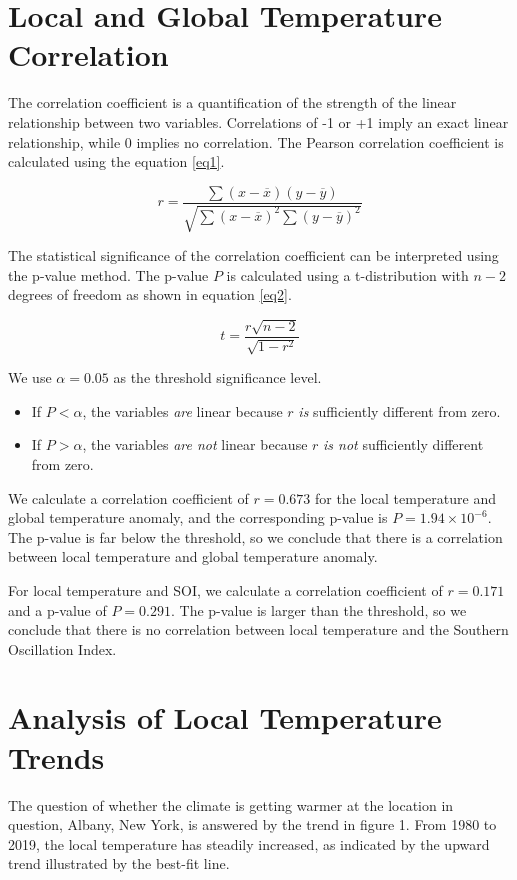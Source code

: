 \documentclass[12pt]{article}
\begin{document}
\section*{Local and Global Temperature Correlation}
The correlation coefficient is a quantification of the
strength of the linear relationship between two variables.
Correlations of -1 or +1 imply an exact linear relationship,
while 0 implies no correlation.
The Pearson correlation coefficient is calculated using
the equation \ref{eq1}.

\begin{equation}\label{eq1}
 r = \frac{\sum (x - \overline{x}) (y - \overline{y})}
 {\sqrt{\sum (x - \overline{x})^2 \sum (y - \overline{y})^2}}
\end{equation}

The statistical significance of the correlation coefficient can be
interpreted using the p-value method.
The p-value $P$ is calculated using a t-distribution with
$n - 2$ degrees of freedom as shown in equation \ref{eq2}.

\begin{equation}\label{eq2}
 t = \frac{r \sqrt{n-2}}{\sqrt{1 - r^2}}
\end{equation}

We use $\alpha = 0.05$ as the threshold significance level.
\begin{itemize}
 \item If $P < \alpha$, the variables \textit{are}
 linear because $r$ \textit{is} sufficiently different from zero.
 \item If $P > \alpha$, the variables \textit{are not}
 linear because $r$ \textit{is not} sufficiently different from zero.
\end{itemize}

We calculate a correlation coefficient of $r = 0.673$ for
the local temperature and global temperature anomaly,
and the corresponding p-value is $P = 1.94 \times 10^{-6}$.
The p-value is far below the threshold, so we conclude that
there is a correlation between local temperature and
global temperature anomaly.

For local temperature and SOI, we calculate a correlation
coefficient of $r = 0.171$ and a p-value of $P = 0.291$.
The p-value is larger than the threshold, so we
conclude that there is no correlation between local temperature
and the Southern Oscillation Index.

\section*{Analysis of Local Temperature Trends}
The question of whether the climate is getting warmer at the
location in question, Albany, New York, is answered by
the trend in figure 1.
From 1980 to 2019, the local temperature has steadily increased,
as indicated by the upward trend illustrated by the best-fit line.
\end{document}
